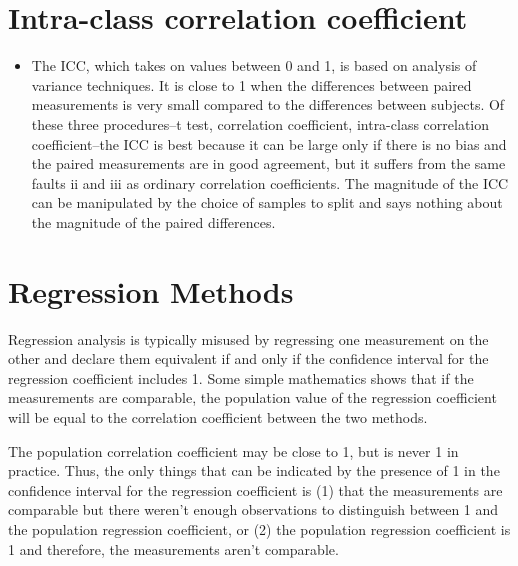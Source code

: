 \documentclass[12pt, a4paper]{report}
\theoremstyle{plain}
\theoremstyle{definition}
\theoremstyle{remark}
\begin{document}
	
	


	
	\newpage

	\section*{Intra-class correlation coefficient}
	\begin{itemize}
		\item The ICC, which takes on values between 0 and 1, is based on analysis of variance techniques. It is close to 1 when the differences between paired measurements is very small compared to the differences between subjects. Of these three procedures--t test, correlation coefficient, intra-class correlation coefficient--the ICC is best because it can be large only if there is no bias and the paired measurements are in good agreement, but it suffers from the same faults ii and iii as ordinary correlation coefficients. The magnitude of the ICC can be manipulated by the choice of samples to split and says nothing about the magnitude of the paired differences.
	\end{itemize}

	\section*{Regression Methods}
 Regression analysis is typically misused by regressing one measurement on the other and declare them equivalent if and only if the confidence interval for the regression coefficient includes 1. Some simple mathematics shows that if the measurements are comparable, the population value of the regression coefficient will be equal to the correlation coefficient between the two methods. 
 
		
	The population correlation coefficient may be close to 1, but is never 1 in practice. Thus, the only things that can be indicated by the presence of 1 in the confidence interval for the regression coefficient is (1) that the measurements are comparable but there weren't enough observations to distinguish between 1 and the population regression coefficient, or (2) the population regression coefficient is 1 and therefore, the measurements aren't comparable.
		
\end{document}
